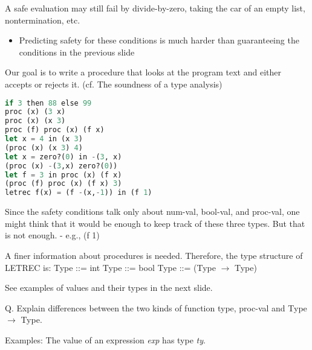 \documentclass{article}
\begin{document}
\begin{huge}
A safe evaluation may still fail by divide-by-zero, taking the car of an empty list, nontermination, etc. 
\begin{itemize}
\item Predicting safety for these conditions is much harder than guaranteeing the conditions in the previous slide
\end{itemize}


Our goal is to write a procedure that looks at the program text and either accepts or rejects it. 
(cf. The soundness of a type analysis)

\begin{lstlisting}[language=Lisp]
if 3 then 88 else 99
proc (x) (3 x)
proc (x) (x 3)
proc (f) proc (x) (f x)
let x = 4 in (x 3)
(proc (x) (x 3) 4)
let x = zero?(0) in -(3, x)
(proc (x) -(3,x) zero?(0))
let f = 3 in proc (x) (f x)
(proc (f) proc (x) (f x) 3)
letrec f(x) = (f -(x,-1)) in (f 1)
\end{lstlisting}


Since the safety conditions talk only about num-val, bool-val, and proc-val, one might think that it would be enough to
keep track of these three types. But that is not enough. \al
- e.g., (f 1)

A finer information about procedures is needed. Therefore, the type structure of LETREC is: \al
Type ::= int  \al
Type ::= bool  \al
Type ::= (Type $\rightarrow$ Type) 

See examples of values and their types in the next slide.

Q. Explain differences between the two kinds of function type, proc-val and Type $\rightarrow$ Type.


Examples: The value of an expression {\it exp} has type {\it ty}.


\end{huge}
\end{document}
